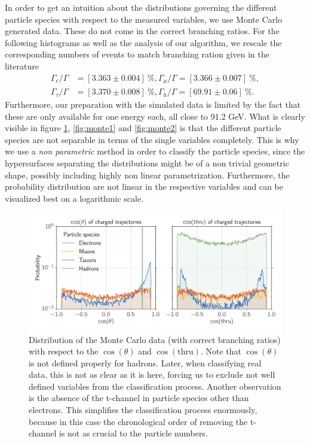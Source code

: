 \label{sub:montecarlo}
In order to get an intuition about the distributions governing the different particle species with respect to the measured
variables, we use Monte Carlo generated data. These do not come in the correct branching ratios. For the following histograms 
as well as the analysis of our algorithm, we rescale the corresponding numbers of events to match branching ration given 
in the literature~\cite{pdg}
\begin{align*}
    \Gamma_e/\Gamma &= [3.363 \pm 0.004] \: \% ,
    \Gamma_\mu/\Gamma = [3.366\pm 0.007] \: \% ,\\
    \Gamma_\tau / \Gamma &= [3.370 \pm 0.008]\: \% ,
    \Gamma_h / \Gamma = [69.91 \pm 0.06]\: \%.
\end{align*}
Furthermore, our preparation with the simulated data is limited by the fact that these are 
only available for one energy each, all close to 91.2 GeV.  
What is clearly visible in figure \ref{fig:cos_figs}, \ref{fig:monte1} and \ref{fig:monte2} is that the
different particle species are not separable in terms of the single variables completely. This is why we use a 
\textit{non parametric} method in order to classify the particle species, since the hypersurfaces separating the distributions
might be of a non trivial geometric shape, possibly including highly non linear parametrization. 
Furthermore, the probability distribution are not linear in the respective variables and can be visualized best on a logarithmic 
scale.
\begin{figure}[htpb]
    \centering
    \includegraphics[width=1.0\linewidth]{figures/cos_figs}
    \caption{Distribution of the Monte Carlo data (with correct branching ratios) 
    with respect to the $\cos(\theta)$ and $\cos(\mathrm{thru})$. Note that $\cos(\theta)$ is not defined properly
    for hadrons. Later, when classifying
    real data, this is not as clear as it is here, forcing us to exclude not well defined variables from the classification process.
    Another observation is the absence of the t-channel in particle species other than electrons. This simplifies 
    the classification process enormously, because in this case the chronological 
    order of removing the t-channel is not as crucial to the particle numbers.}
    \label{fig:cos_figs}
\end{figure}

